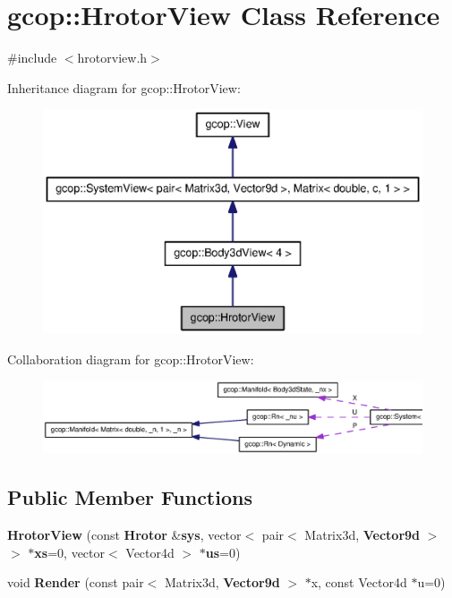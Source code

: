 \section{gcop\-:\-:\-Hrotor\-View \-Class \-Reference}
\label{classgcop_1_1HrotorView}


{\ttfamily \#include $<$hrotorview.\-h$>$}



\-Inheritance diagram for gcop\-:\-:\-Hrotor\-View\-:\nopagebreak
\begin{figure}[H]
\begin{center}
\leavevmode
\includegraphics[width=350pt]{classgcop_1_1HrotorView__inherit__graph}
\end{center}
\end{figure}


\-Collaboration diagram for gcop\-:\-:\-Hrotor\-View\-:\nopagebreak
\begin{figure}[H]
\begin{center}
\leavevmode
\includegraphics[width=350pt]{classgcop_1_1HrotorView__coll__graph}
\end{center}
\end{figure}
\subsection*{\-Public \-Member \-Functions}
\begin{DoxyCompactItemize}
\item 
{\bf \-Hrotor\-View} (const {\bf \-Hrotor} \&{\bf sys}, vector$<$ pair$<$ \-Matrix3d, {\bf \-Vector9d} $>$ $>$ $\ast${\bf xs}=0, vector$<$ \-Vector4d $>$ $\ast${\bf us}=0)
\item 
void {\bf \-Render} (const pair$<$ \-Matrix3d, {\bf \-Vector9d} $>$ $\ast$x, const \-Vector4d $\ast$u=0)
\end{DoxyCompactItemize}
